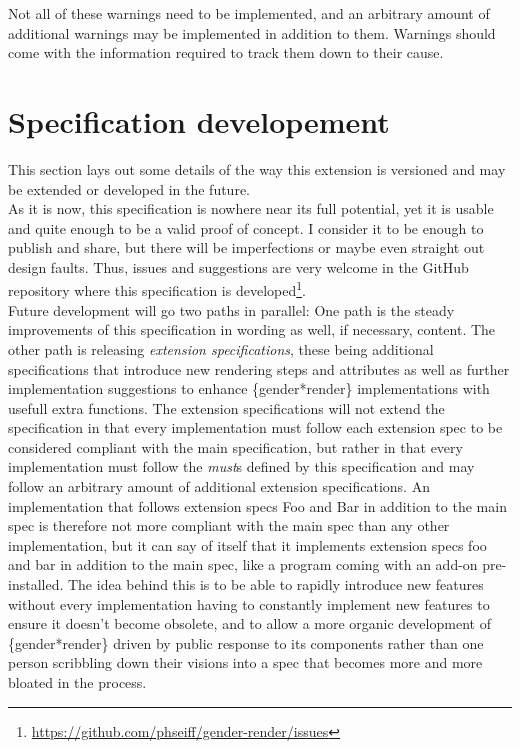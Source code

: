 \documentclass{article}
\begin{document}
    Not all of these warnings need to be implemented, and an arbitrary amount of additional warnings may be implemented in addition to them.
    Warnings should come with the information required to track them down to their cause.

\section{Specification developement}

    This section lays out some details of the way this extension is versioned and may be extended or developed in the future.\\

    As it is now, this specification is nowhere near its full potential, yet it is usable and quite enough to be a valid proof of concept.
    I consider it to be enough to publish and share, but there will be imperfections or maybe even straight out design faults.
    Thus, issues and suggestions are very welcome in the GitHub repository where this specification is developed\footnote{\url{https://github.com/phseiff/gender-render/issues}}.\\

    Future development will go two paths in parallel: One path is the steady improvements of this specification in wording as well, if necessary, content.
    The other path is releasing \emph{extension specifications}, these being additional specifications that introduce new rendering steps and attributes as well as further implementation suggestions to enhance \{gender*render\} implementations with usefull extra functions.
    The extension specifications will not extend the specification in that every implementation must follow each extension spec to be considered compliant with the main specification, but rather in that every implementation must follow the \emph{must}s defined by this specification and may follow an arbitrary amount of additional extension specifications.
    An implementation that follows extension specs Foo and Bar in addition to the main spec is therefore not more compliant with the main spec than any other implementation, but it can say of itself that it implements extension specs foo and bar in addition to the main spec, like a program coming with an add-on pre-installed.
    The idea behind this is to be able to rapidly introduce new features without every implementation having to constantly implement new features to ensure it doesn't become obsolete, and to allow a more organic development of \{gender*render\} driven by public response to its components rather than one person scribbling down their visions into a spec that becomes more and more bloated in the process.\\
\end{document}
